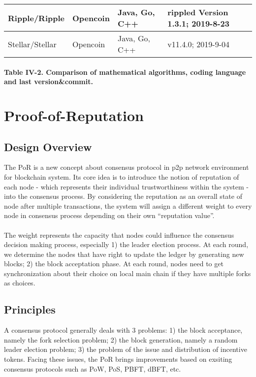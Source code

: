 \documentclass[doublespacing]{bmcart}
\begin{document}
\begin{CJK*}{UTF8}{gbsn}
\begin{tabular}{p{2cm}p{3cm}p{3cm}p{3cm}}
Ripple/Ripple & Opencoin & Java, Go, C++ & rippled Version 1.3.1; 2019-8-23 \\ \hline

Stellar/Stellar & Opencoin & Java, Go, C++ & v11.4.0; 2019-9-04 \\ \hline
\end{tabular}
\paragraph{Table IV-2. Comparison of mathematical algorithms, coding language and last version\&commit.}


\section{Proof-of-Reputation}
\renewcommand\thesubsection{\Roman{section}.\arabic{subsection}}
\subsection{Design Overview}
The PoR is a new concept about consensus protocol in p2p network environment for blockchain system. Its core idea is to introduce the notion of reputation of each node - which represents their individual trustworthiness within the system -  into the consensus process. By considering the reputation as an overall state of node after multiple transactions, the system will assign a different weight to every node  in consensus process depending on their own ``reputation value''. 
\paragraph{} The weight represents the capacity that nodes could influence the consensus decision making process, especially 1) the leader election process. At each round, we determine the nodes that have right to update the ledger by generating new blocks; 2) the block acceptation phase. At each round, nodes need to get synchronization about their choice on local main chain if they have multiple forks as choices.

\subsection{Principles}
A consensus protocol generally deals with 3 problems: 1) the block acceptance, namely the fork selection problem; 2) the block generation, namely a random leader election problem; 3) the problem of the issue and distribution of incentive tokens. Facing these issues, the PoR brings improvements based on exsiting consensus protocols such as PoW, PoS, PBFT, dBFT, etc.

\end{CJK*}
\end{document}
